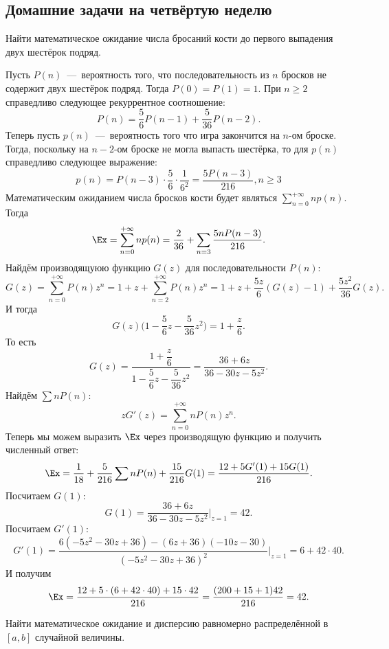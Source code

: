 \subsection{Домашние задачи на четвёртую неделю}
\begin{problem}
    Найти математическое ожидание числа бросаний кости до первого выпадения двух шестёрок подряд.
\end{problem}
\begin{solution}
    Пусть $P(n)$~---~вероятность того, что последовательность из $n$ бросков не содержит двух шестёрок подряд.
    Тогда $P(0) = P(1) = 1$.
    При $n \geq 2$ справедливо следующее рекуррентное соотношение:
    \[
        P(n) = \dfrac{5}{6}P(n - 1) + \dfrac{5}{36}P(n - 2).
    \]
    Теперь пусть $p(n)$~---~вероятность того что игра закончится на $n$-ом броске.
    Тогда, поскольку на $n - 2$-ом броске не могла выпасть шестёрка, то для $p(n)$ справедливо следующее выражение:
    \[
        p(n) = P(n - 3)\cdot \dfrac{5}{6} \cdot \dfrac{1}{6^2} = \dfrac{5P(n - 3)}{216}, n \geq 3
    \]
    Математическим ожиданием числа бросков кости будет являться $\sum\limits_{n = 0}^{+\infty}np(n)$.
    Тогда
    \[
       \Ex = \sum\limits_{n = 0}^{+\infty} np(n) = \dfrac{2}{36} + \sum\limits_{n = 3} \dfrac{5nP(n - 3)}{216}.
    \]
    Найдём производящуюю функцию $G(z)$ для последовательности $P(n)$:
    \[
        G(z) = \sum\limits_{n = 0}^{+\infty} P(n)z^n = 1 + z + \sum\limits_{n = 2}^{+\infty} P(n)z^n = 1 + z + \dfrac{5z}{6}(G(z) - 1) + \dfrac{5z^2}{36}G(z).
    \]
    И тогда
    \[
        G(z)\biggr(1 - \dfrac{5}{6}z - \dfrac{5}{36}z^2\biggr) = 1 + \dfrac{z}{6}.
    \]
    То есть
    \[
        G(z) = \dfrac{1 + \dfrac{z}{6}}{1 - \dfrac{5}{6}z - \dfrac{5}{36}z^2} = \dfrac{36 + 6z}{36 - 30z - 5z^2}.
    \]
    Найдём $\sum nP(n)$:
    \[
        zG'(z) = \sum\limits_{n = 0}^{+\infty} nP(n)z^n.
    \]
    Теперь мы можем выразить $\Ex$ через производящую функцию и получить численный ответ:
    \[
        \Ex = \dfrac{1}{18} + \dfrac{5}{216}\sum nP(n) + \dfrac{15}{216}G(1) = \dfrac{12 + 5G'(1) + 15G(1)}{216}.
    \]
    Посчитаем $G(1):$
    \[
        G(1) = \dfrac{36 + 6z}{36 - 30z - 5z^2}\biggr|_{z = 1} = 42.
    \]
    Посчитаем $G'(1)$:
    \[
        G'(1) = \dfrac{6(-5z^2 - 30z + 36) - (6z + 36)(-10z - 30)}{(-5z^2 - 30z + 36)^2}\biggr|_{z = 1} = 6 + 42 \cdot 40.
    \]
    И получим
    \[
        \Ex = \dfrac{12 + 5 \cdot (6 + 42 \cdot 40) + 15 \cdot 42}{216} = \dfrac{(200 + 15 + 1)42}{216} = 42.
    \]
\end{solution}
\begin{problem}
    Найти математическое ожидание и дисперсию равномерно распределённой в $[a, b]$ случайной величины.
\end{problem}
